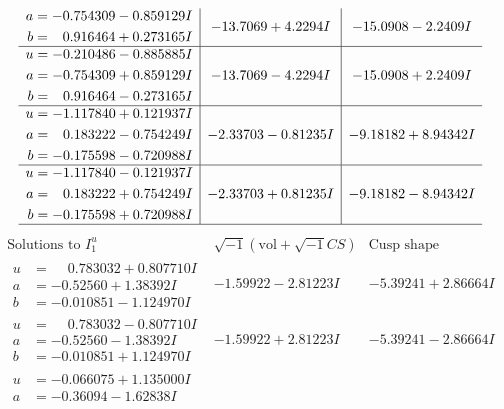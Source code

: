 \documentclass[1p]{elsarticle_modified}
\theoremstyle{definition}
\newcommand{\I}{\sqrt{-1}}
\begin{document}
$$\begin{array}{c|c|c}
\begin{aligned}
a &= -0.754309 - 0.859129 I \\
b &= \phantom{-}0.916464 + 0.273165 I\end{aligned}
 & -13.7069 + 4.2294 I & -15.0908 - 2.2409 I \\ \hline\begin{aligned}
u &= -0.210486 - 0.885885 I \\
a &= -0.754309 + 0.859129 I \\
b &= \phantom{-}0.916464 - 0.273165 I\end{aligned}
 & -13.7069 - 4.2294 I & -15.0908 + 2.2409 I \\ \hline\begin{aligned}
u &= -1.117840 + 0.121937 I \\
a &= \phantom{-}0.183222 - 0.754249 I \\
b &= -0.175598 - 0.720988 I\end{aligned}
 & -2.33703 - 0.81235 I & -9.18182 + 8.94342 I \\ \hline\begin{aligned}
u &= -1.117840 - 0.121937 I \\
a &= \phantom{-}0.183222 + 0.754249 I \\
b &= -0.175598 + 0.720988 I\end{aligned}
 & -2.33703 + 0.81235 I & -9.18182 - 8.94342 I\\
 \hline 
 \end{array}$$\newpage$$\begin{array}{c|c|c}  
\text{Solutions to }I^u_{1}& \I (\text{vol} + \sqrt{-1}CS) & \text{Cusp shape}\\
 \hline 
\begin{aligned}
u &= \phantom{-}0.783032 + 0.807710 I \\
a &= -0.52560 + 1.38392 I \\
b &= -0.010851 - 1.124970 I\end{aligned}
 & -1.59922 - 2.81223 I & -5.39241 + 2.86664 I \\ \hline\begin{aligned}
u &= \phantom{-}0.783032 - 0.807710 I \\
a &= -0.52560 - 1.38392 I \\
b &= -0.010851 + 1.124970 I\end{aligned}
 & -1.59922 + 2.81223 I & -5.39241 - 2.86664 I \\ \hline\begin{aligned}
u &= -0.066075 + 1.135000 I \\
a &= -0.36094 - 1.62838 I \\

\end{aligned}
\end{array}$$
\end{document}
